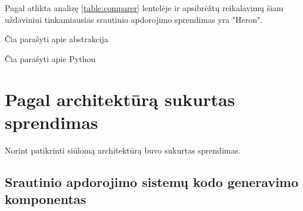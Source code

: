 \documentclass{VUMIFPSbakalaurinis}
\begin{document}
Pagal atlikta analizę \ref{table:comparer} lentelėje ir apsibrėžtų reikalavimų šiam uždaviniui tinkamiausias srautinio apdorojimo sprendimas yra "Heron". \par
Čia parašyti apie abstrakcija \par
Čia parašyti apie Python \par
 

\section{Pagal architektūrą sukurtas sprendimas}

Norint patikrinti siūlomą architektūrą buvo sukurtas sprendimas.

\subsection{Srautinio apdorojimo sistemų kodo generavimo komponentas}
\end{document}
